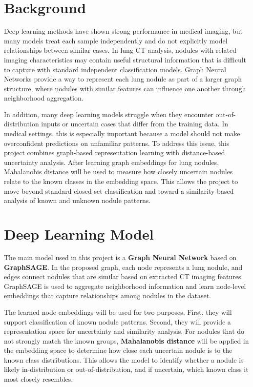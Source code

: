 \documentclass[12pt]{article}
\begin{document}
\section*{Background}

Deep learning methods have shown strong performance in medical imaging, but many models treat each sample independently and do not explicitly model relationships between similar cases. In lung CT analysis, nodules with related imaging characteristics may contain useful structural information that is difficult to capture with standard independent classification models. Graph Neural Networks provide a way to represent each lung nodule as part of a larger graph structure, where nodules with similar features can influence one another through neighborhood aggregation.

In addition, many deep learning models struggle when they encounter out-of-distribution inputs or uncertain cases that differ from the training data. In medical settings, this is especially important because a model should not make overconfident predictions on unfamiliar patterns. To address this issue, this project combines graph-based representation learning with distance-based uncertainty analysis. After learning graph embeddings for lung nodules, Mahalanobis distance will be used to measure how closely uncertain nodules relate to the known classes in the embedding space. This allows the project to move beyond standard closed-set classification and toward a similarity-based analysis of known and unknown nodule patterns.

\section*{Deep Learning Model}

The main model used in this project is a \textbf{Graph Neural Network} based on \textbf{GraphSAGE}. In the proposed graph, each node represents a lung nodule, and edges connect nodules that are similar based on extracted CT imaging features. GraphSAGE is used to aggregate neighborhood information and learn node-level embeddings that capture relationships among nodules in the dataset.

The learned node embeddings will be used for two purposes. First, they will support classification of known nodule patterns. Second, they will provide a representation space for uncertainty and similarity analysis. For nodules that do not strongly match the known groups, \textbf{Mahalanobis distance} will be applied in the embedding space to determine how close each uncertain nodule is to the known class distributions. This allows the model to identify whether a nodule is likely in-distribution or out-of-distribution, and if uncertain, which known class it most closely resembles.
\end{document}
